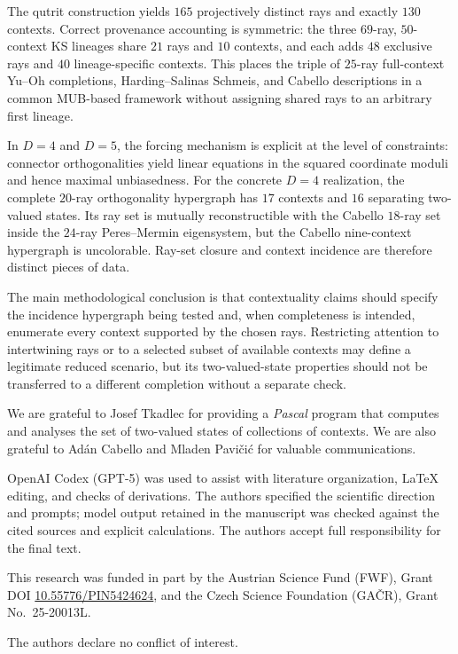\documentclass[%
  reprint,
  superscriptaddress,
  showpacs,
  showkeys,
  amsmath,amssymb,
  pra,
  longbibliography,
  floatfix,
  x11names
]{revtex4-2}
\newcommand{\rev}[1]{{#1}}
\newenvironment{revision}{\begingroup}{\endgroup}
\begin{document}
\begin{revision}
The qutrit construction yields $165$ projectively distinct rays and exactly $130$ contexts.  Correct provenance accounting is symmetric: the three $69$-ray, $50$-context KS lineages share $21$ rays and $10$ contexts, and each adds $48$ exclusive rays and $40$ lineage-specific contexts.  This places the triple of $25$-ray full-context Yu--Oh completions, Harding--Salinas Schmeis, and Cabello descriptions in a common MUB-based framework without assigning shared rays to an arbitrary first lineage.

In $D=4$ and $D=5$, the forcing mechanism is explicit at the level of constraints: connector orthogonalities yield linear equations in the squared coordinate moduli and hence maximal unbiasedness.  For the concrete $D=4$ realization, the complete $20$-ray orthogonality hypergraph has $17$ contexts and $16$ separating two-valued states.  Its ray set is mutually reconstructible with the Cabello $18$-ray set inside the $24$-ray Peres--Mermin eigensystem, but the Cabello nine-context hypergraph is uncolorable.  Ray-set closure and context incidence are therefore distinct pieces of data.

The main methodological conclusion is that contextuality claims should specify the incidence hypergraph being tested and, when completeness is intended, enumerate every context supported by the chosen rays.  Restricting attention to intertwining rays or to a selected subset of available contexts may define a legitimate reduced scenario, but its two-valued-state properties should not be transferred to a different completion without a separate check.
\end{revision}

\begin{acknowledgments}
We are grateful to Josef Tkadlec for providing a {\em Pascal} program that computes and analyses the set of two-valued states of collections of contexts.
We are also grateful to Ad\'{a}n Cabello and Mladen Pavi{\v{c}}i{\'{c}} for valuable communications.

\rev{OpenAI Codex (GPT-5) was used to assist with literature organization, \LaTeX{}
editing, and checks of derivations.  The authors
specified the scientific
direction and prompts; model output retained in the manuscript was checked
against the cited sources and explicit calculations.  The authors accept
full
responsibility for the final text.}

This research was funded in part by the Austrian
Science Fund (FWF), Grant DOI \href{https://doi.org/10.55776/PIN5424624}{10.55776/PIN5424624},
and the Czech Science
Foundation (GA\v{C}R), Grant No.~25-20013L.

The authors declare no conflict of interest.
\end{acknowledgments}
\end{document}
